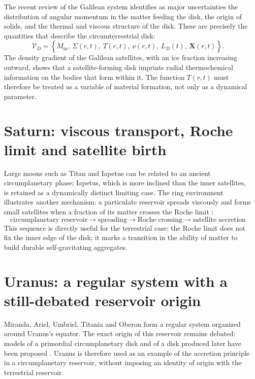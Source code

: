 \documentclass[11pt,a4paper,openany]{report}
\begin{document}
The recent review of the Galilean system \cite{Nimmo2026} identifies as major uncertainties the
distribution of angular momentum in the matter feeding the disk, the origin of solids, and the
thermal and viscous structure of the disk. These are precisely the quantities that describe the
circumterrestrial disk:
\begin{equation}
\mathcal{V}_D=\left\{\dot M_{\mathrm{in}},\ \Sigma(r,t),\ T(r,t),\ \nu(r,t),\ L_D(t),\
\mathbf{X}(r,t)\right\}.
\label{eq:VD}
\end{equation}
The density gradient of the Galilean satellites, with an ice fraction increasing outward, shows
that a satellite-forming disk imprints radial thermochemical information on the bodies that form
within it. The function $T(r,t)$ must therefore be treated as a variable of material formation, not
only as a dynamical parameter.

\section{Saturn: viscous transport, Roche limit and satellite birth}

Large moons such as Titan and Iapetus can be related to an ancient circumplanetary phase; Iapetus,
which is more inclined than the inner satellites, is retained as a dynamically distinct limiting
case. The ring environment illustrates another mechanism: a particulate reservoir spreads
viscously and forms small satellites when a fraction of its matter crosses the Roche limit
\cite{Charnoz2010,Blanc2025}:
\begin{equation}
\text{circumplanetary reservoir}\to\text{spreading}\to
\text{Roche crossing}\to\text{satellite accretion}
\label{eq:saturne}
\end{equation}
This sequence is directly useful for the terrestrial case: the Roche limit does not fix the inner
edge of the disk; it marks a transition in the ability of matter to build durable self-gravitating
aggregates.

\section{Uranus: a regular system with a still-debated reservoir origin}

Miranda, Ariel, Umbriel, Titania and Oberon form a regular system organized around Uranus's
equator. The exact origin of this reservoir remains debated: models of a primordial
circumplanetary disk and of a disk produced later have been proposed \cite{Helled2020,Blanc2025}.
Uranus is therefore used as an example of the accretion principle in a circumplanetary reservoir,
without imposing an identity of origin with the terrestrial reservoir.
\end{document}
